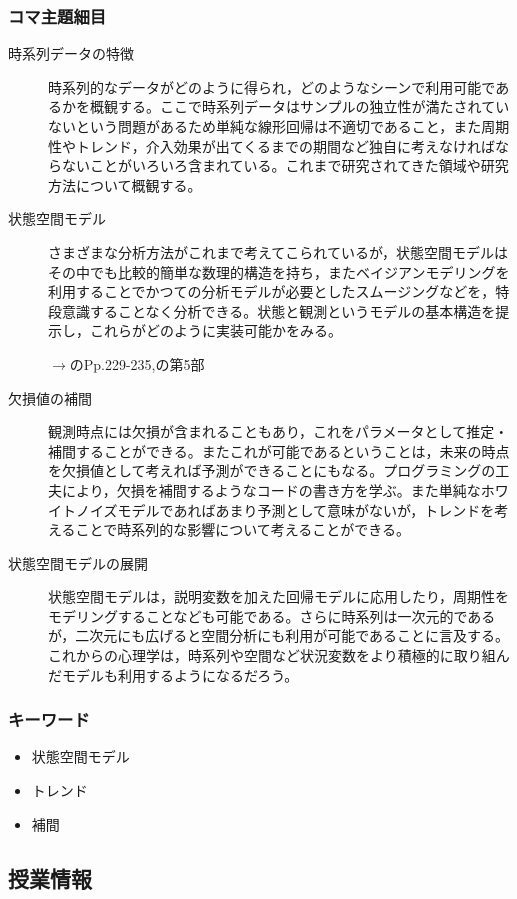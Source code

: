 \subsubsection{コマ主題細目}
\begin{description}
	\item[時系列データの特徴] 時系列的なデータがどのように得られ，どのようなシーンで利用可能であるかを概観する。ここで時系列データはサンプルの独立性が満たされていないという問題があるため単純な線形回帰は不適切であること，また周期性やトレンド，介入効果が出てくるまでの期間など独自に考えなければならないことがいろいろ含まれている。これまで研究されてきた領域や研究方法について概観する。
	\item[状態空間モデル] さまざまな分析方法がこれまで考えてこられているが，状態空間モデルはその中でも比較的簡単な数理的構造を持ち，またベイジアンモデリングを利用することでかつての分析モデルが必要としたスムージングなどを，特段意識することなく分析できる。状態と観測というモデルの基本構造を提示し，これらがどのように実装可能かをみる。
	      \begin{flushright}
		      $\to$\textcite{Matsuura201610}のPp.229-235,\textcite{Baba201907}の第5部
	      \end{flushright}
	\item[欠損値の補間] 観測時点には欠損が含まれることもあり，これをパラメータとして推定・補間することができる。またこれが可能であるということは，未来の時点を欠損値として考えれば予測ができることにもなる。プログラミングの工夫により，欠損を補間するようなコードの書き方を学ぶ。また単純なホワイトノイズモデルであればあまり予測として意味がないが，トレンドを考えることで時系列的な影響について考えることができる。
	\item[状態空間モデルの展開] 状態空間モデルは，説明変数を加えた回帰モデルに応用したり，周期性をモデリングすることなども可能である。さらに時系列は一次元的であるが，二次元にも広げると空間分析にも利用が可能であることに言及する。これからの心理学は，時系列や空間など状況変数をより積極的に取り組んだモデルも利用するようになるだろう。
\end{description}
\subsubsection{キーワード}
\begin{itemize}
	\item 状態空間モデル
	\item トレンド
	\item 補間
\end{itemize}
\subsection{授業情報}
